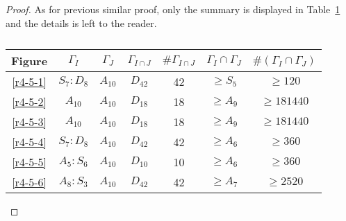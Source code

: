 \begin{proof}
  As for previous similar proof, only the summary is displayed in Table~\ref{table-4} and the details is left to the reader.

  \begin{table}[H]
    \centering
    \begin{tabular}{|c|c|c|c|c|c|c|}
      \hline
      Figure & $\Gamma_{I}$ & $\Gamma_{J}$ & $\Gamma_{I \cap J}$ & $\#\Gamma_{I \cap J}$ & $\Gamma_{I} \cap \Gamma_{J}$ & $\#(\Gamma_{I} \cap \Gamma_{J})$ \\ \hline

      \ref{r4-5-1} & $S_7 : D_8$ & $A_{10}$ & $D_{42}$ & 42 & $\ge S_5$ & $\ge 120$ \\ \hline
      \ref{r4-5-2} & $A_{10}$ & $A_{10}$ & $D_{18}$ & 18 & $\ge A_9$ & $\ge 181440$ \\ \hline
      \ref{r4-5-3} & $A_{10}$ & $A_{10}$ & $D_{18}$ & 18 & $\ge A_9$ & $\ge 181440$ \\ \hline
      \ref{r4-5-4} & $S_7 : D_8$ & $A_{10}$ & $D_{42}$ & 42 & $\ge A_6$ & $\ge 360$ \\ \hline
      \ref{r4-5-5} & $A_5 : S_6$ & $A_{10}$ & $D_{10}$ & 10 & $\ge A_6$ & $\ge 360$ \\ \hline
      \ref{r4-5-6} & $A_8 : S_3$ & $A_{10}$ & $D_{42}$ & 42 & $\ge A_7$ & $\ge 2520$ \\ \hline

    \end{tabular}
    \caption{}
    \label{table-4}
  \end{table}
\end{proof}
